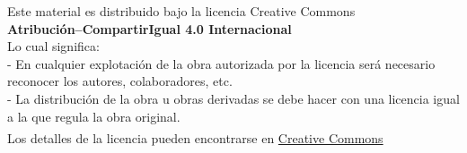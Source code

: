 \documentclass[a4paper,12pt,twoside,spanish,reqno,dottedtoc]{scrbook}
\begin{document}
    ${}^{}$\\
    {\flushleft 
        Este material es distribuido bajo la licencia Creative Commons} \\
        \center      \textbf{Atribución--CompartirIgual 4.0 Internacional}
    \\ 
    \center  Lo cual significa: 
    \\
    \flushleft
    - En cualquier explotación de la obra autorizada por la licencia será necesario reconocer los autores, colaboradores, etc.\\
    - La distribución de la obra u obras derivadas se debe hacer con una licencia igual a la que regula la obra original.\\
    ${}^{}$
    \\
    Los detalles de la licencia pueden encontrarse en \href{https://creativecommons.org/licenses/by/4.0/deed.es}{Creative Commons}
    \vskip 1cm 
    \endgroup

    
    
    \pagestyle{scrheadings} %
    \cleardoublepage %
    \cleardoublepage
    



    
    \setcounter{chapter}{0}
    \cleardoublepage
        
        
     
\end{document}
